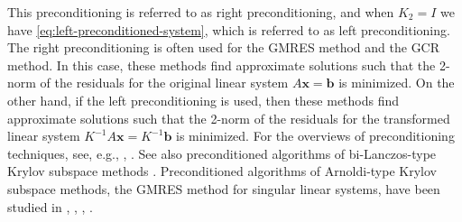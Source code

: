 {This preconditioning is referred to as right preconditioning, and when $K_2=I$ we have \eqref{eq:left-preconditioned-system}, which is referred to as left preconditioning.}
{The right preconditioning is often used for the GMRES method and the GCR method. In this case, these methods find approximate solutions such that the 2-norm of the residuals for the original linear system $A\bm x=\bm b$ is minimized. On the other hand, if the left preconditioning is used, then these methods find approximate solutions such that the 2-norm of the residuals for the transformed linear system $K^{-1}A\bm x=K^{-1}\bm b$ is minimized.}
{For the overviews of preconditioning techniques, see, e.g., , . See also preconditioned algorithms of bi-Lanczos-type Krylov subspace methods . Preconditioned algorithms of Arnoldi-type Krylov subspace methods, the GMRES method for singular linear systems, have been studied in , , , .}
